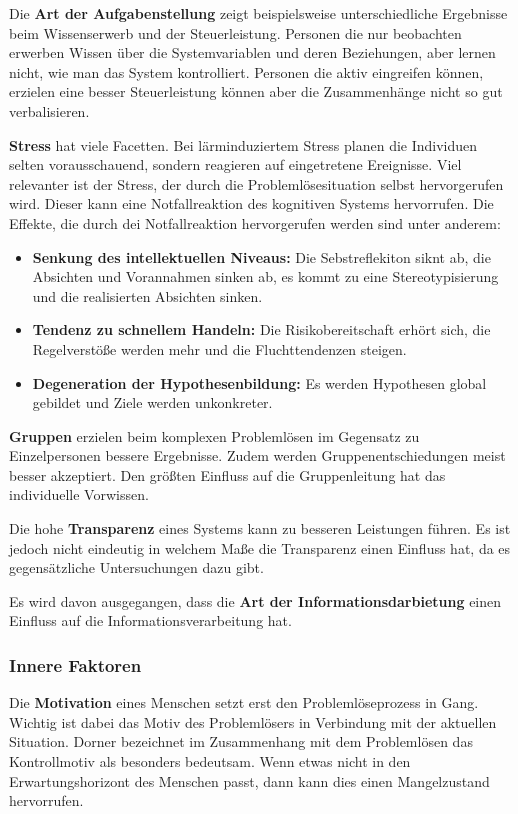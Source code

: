 Die \textbf{Art der Aufgabenstellung} zeigt beispielsweise unterschiedliche Ergebnisse beim Wissenserwerb und der Steuerleistung. Personen die nur beobachten erwerben Wissen über die Systemvariablen und deren Beziehungen, aber lernen nicht, wie man das System kontrolliert. Personen die aktiv eingreifen können, erzielen eine besser Steuerleistung können aber die Zusammenhänge nicht so gut verbalisieren.

\textbf{Stress} hat viele Facetten. Bei lärminduziertem Stress planen die Individuen selten vorausschauend, sondern reagieren auf eingetretene Ereignisse. Viel relevanter ist der Stress, der durch die Problemlösesituation selbst hervorgerufen wird. Dieser kann eine Notfallreaktion des kognitiven Systems hervorrufen. Die Effekte, die durch dei Notfallreaktion hervorgerufen werden sind unter anderem:
\begin{itemize}
\item \textbf{Senkung des intellektuellen Niveaus:} Die Sebstreflekiton siknt ab, die Absichten und Vorannahmen sinken ab, es kommt zu eine Stereotypisierung und die realisierten Absichten sinken.
\item \textbf{Tendenz zu schnellem Handeln:} Die Risikobereitschaft erhört sich, die Regelverstöße werden mehr und die Fluchttendenzen steigen.
\item \textbf{Degeneration der Hypothesenbildung:} Es werden Hypothesen global gebildet und Ziele werden unkonkreter.
\end{itemize}

\textbf{Gruppen} erzielen beim komplexen Problemlösen im Gegensatz zu Einzelpersonen bessere Ergebnisse. Zudem werden Gruppenentschiedungen meist besser akzeptiert. Den größten Einfluss auf die Gruppenleitung hat das individuelle Vorwissen.

Die hohe \textbf{Transparenz} eines Systems kann zu besseren Leistungen führen. Es ist jedoch nicht eindeutig in welchem Maße die Transparenz einen Einfluss hat, da es gegensätzliche Untersuchungen dazu gibt.

Es wird davon ausgegangen, dass die \textbf{Art der Informationsdarbietung} einen Einfluss auf die Informationsverarbeitung hat.

\subsubsection*{Innere Faktoren}
Die \textbf{Motivation} eines Menschen setzt erst den Problemlöseprozess in Gang. \cite{Dorner1984} Wichtig ist dabei das Motiv des Problemlösers in Verbindung mit der aktuellen Situation. Dorner bezeichnet im Zusammenhang mit dem Problemlösen das Kontrollmotiv als besonders bedeutsam. Wenn etwas nicht in den Erwartungshorizont des Menschen passt, dann kann dies einen Mangelzustand hervorrufen. 

